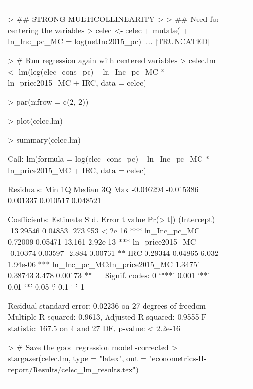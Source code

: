 \begin{table}[h]
\begin{tabular}{lccc}
> ## STRONG MULTICOLLINEARITY
> 
> ## Need for centering the variables
> celec <- celec %
+     mutate(
+         ln_Inc_pc_MC = log(netInc2015_pc)  .... [TRUNCATED] 

> # Run regression again with centered variables
> celec.lm <- lm(log(elec_cons_pc) ~ ln_Inc_pc_MC * ln_price2015_MC + IRC, data = celec)

> par(mfrow = c(2, 2))

> plot(celec.lm)

> summary(celec.lm)

Call:
lm(formula = log(elec_cons_pc) ~ ln_Inc_pc_MC * ln_price2015_MC + 
    IRC, data = celec)

Residuals:
      Min        1Q    Median        3Q       Max 
-0.046294 -0.015386  0.001337  0.010517  0.048521 

Coefficients:
                              Estimate Std. Error  t value Pr(>|t|)    
(Intercept)                  -13.29546    0.04853 -273.953  < 2e-16 ***
ln_Inc_pc_MC                   0.72009    0.05471   13.161 2.92e-13 ***
ln_price2015_MC               -0.10374    0.03597   -2.884  0.00761 ** 
IRC                            0.29344    0.04865    6.032 1.94e-06 ***
ln_Inc_pc_MC:ln_price2015_MC   1.34751    0.38743    3.478  0.00173 ** 
---
Signif. codes:  0 ‘***’ 0.001 ‘**’ 0.01 ‘*’ 0.05 ‘.’ 0.1 ‘ ’ 1

Residual standard error: 0.02236 on 27 degrees of freedom
Multiple R-squared:  0.9613,	Adjusted R-squared:  0.9555 
F-statistic: 167.5 on 4 and 27 DF,  p-value: < 2.2e-16


> # Save the good regression model -corrected
> stargazer(celec.lm, type = "latex", out = "econometrics-II-report/Results/celec_lm_results.tex")


\end{tabular}
\end{table}
